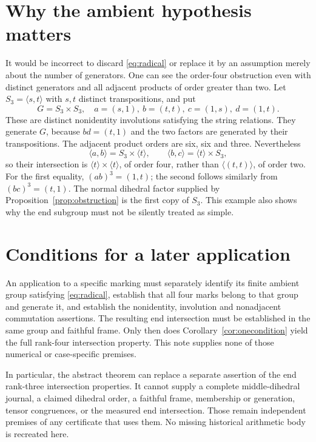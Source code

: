 \documentclass[11pt]{article}
\theoremstyle{definition}\newtheorem{definition}[theorem]{Definition}
\newcommand{\gen}[1]{\langle #1\rangle}
\begin{document}
\section*{Why the ambient hypothesis matters}

It would be incorrect to discard \eqref{eq:radical} or replace it by
an assumption merely about the number of generators.  One can see the
order-four obstruction even with distinct generators and all adjacent
products of order greater than two.
Let $S_3=\gen{s,t}$ with $s,t$ distinct transpositions, and put
\[
 G=S_3\times S_3,\quad
 a=(s,1),\ b=(t,t),\ c=(1,s),\ d=(1,t).
\]
These are distinct nonidentity involutions satisfying the string
relations.  They generate $G$, because $bd=(t,1)$ and the two factors
are generated by their transpositions.  The adjacent product orders
are six, six and three.  Nevertheless
\[
 \gen{a,b}=S_3\times\gen t,
 \qquad \gen{b,c}=\gen t\times S_3,
\]
so their intersection is $\gen t\times\gen t$, of order four, rather
than $\gen{(t,t)}$, of order two.  For the first equality, $(ab)^3=(1,t)$;
the second follows similarly from $(bc)^3=(t,1)$.  The normal dihedral
factor supplied by Proposition~\ref{prop:obstruction} is the first copy
of $S_3$.  This example also shows why the end subgroup must not be
silently treated as simple.

\section*{Conditions for a later application}

An application to a specific marking must separately identify its finite
ambient group satisfying \eqref{eq:radical}, establish that all four
marks belong to that group and generate it, and establish the nonidentity,
involution and nonadjacent commutation assertions.  The resulting end
intersection must be established in the same group and faithful frame.
Only then does Corollary~\ref{cor:onecondition} yield the full rank-four
intersection property.  This note supplies none of those numerical or
case-specific premises.

In particular, the abstract theorem can replace a separate assertion of
the end rank-three intersection properties.  It cannot supply a complete
middle-dihedral journal, a claimed dihedral order, a faithful frame,
membership or generation, tensor congruences, or the measured end
intersection.  Those remain independent premises of any certificate
that uses them.  No missing historical arithmetic body is recreated here.
\end{document}
